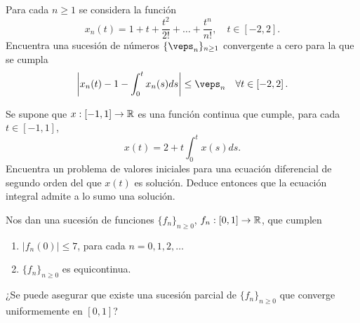 \documentclass[12pt]{article}
\begin{document}
    \begin{ejercicio}
        Para cada $n \geq 1$ se considera la función
        \[
            x_n(t) = 1 + t + \frac{t^2}{2!} + \dots + \frac{t^n}{n!}, \quad t \in \left[-2,2\right].
        \]
        Encuentra una sucesión de números $\{\veps_n\}_{n \geq 1}$ convergente a cero para la que se cumpla
        \[
            \left|x_n(t) - 1 - \int_0^t x_n(s)ds\right| \leq \veps_n \quad \forall t \in \left[-2,2\right].
        \]
    \end{ejercicio}

    \begin{ejercicio}
        Se supone que $x : \left[-1,1\right] \to \mathbb{R}$ es una función continua que cumple, para cada $t \in \left[-1,1\right]$,
        \[
            x(t) = 2 + t \int_0^t x(s)ds.
        \]
        Encuentra un problema de valores iniciales para una ecuación diferencial de segundo orden del que $x(t)$ es solución. Deduce entonces que la ecuación integral admite a lo sumo una solución.
    \end{ejercicio}

    \begin{ejercicio}
        Nos dan una sucesión de funciones $\{f_n\}_{n \geq 0}$, $f_n : \left[0,1\right] \to \mathbb{R}$, que cumplen
        \begin{enumerate}[label=\roman*)]
            \item $|f_n(0)| \leq 7$, para cada $n = 0, 1, 2, \dots$
            \item $\{f_n\}_{n \geq 0}$ es equicontinua.
        \end{enumerate}
        ¿Se puede asegurar que existe una sucesión parcial de $\{f_n\}_{n \geq 0}$ que converge uniformemente en $\left[0,1\right]$?
    \end{ejercicio}

    \newpage
    \setcounter{ejercicio}{0} %
    \noindent
\end{document}

